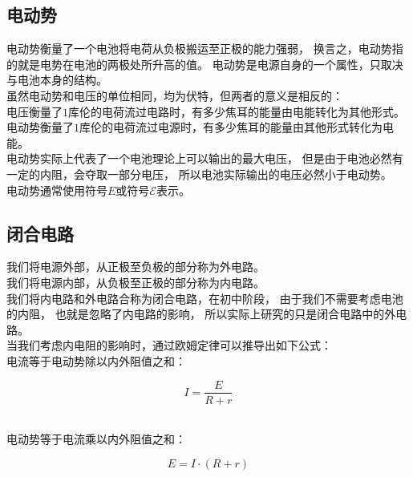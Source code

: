 \documentclass[UTF8]{ctexart}
\begin{document}
\newpage

\subsection{电动势}
    电动势衡量了一个电池将电荷从负极搬运至正极的能力强弱，
    换言之，电动势指的就是电势在电池的两极处所升高的值。
    电动势是电源自身的一个属性，只取决与电池本身的结构。\\[3mm]
    虽然电动势和电压的单位相同，均为伏特，但两者的意义是相反的：\\[3mm]
    电压衡量了$1$库伦的电荷流过电路时，有多少焦耳的能量由电能转化为其他形式。\\[1mm]
    电动势衡量了$1$库伦的电荷流过电源时，有多少焦耳的能量由其他形式转化为电能。\\[3mm]
    电动势实际上代表了一个电池理论上可以输出的最大电压，
    但是由于电池必然有一定的内阻，会夺取一部分电压，
    所以电池实际输出的电压必然小于电动势。\\[3mm]
    电动势通常使用符号$E$或符号$\mathscr{E}$表示。

\subsection{闭合电路}
    我们将电源外部，从正极至负极的部分称为外电路。\\[1mm]
    我们将电源内部，从负极至正极的部分称为内电路。\\[3mm]
    我们将内电路和外电路合称为闭合电路，在初中阶段，
    由于我们不需要考虑电池的内阻，
    也就是忽略了内电路的影响，
    所以实际上研究的只是闭合电路中的外电路。\\[3mm]
    当我们考虑内电阻的影响时，通过欧姆定律可以推导出如下公式：\\[3mm]
    电流等于电动势除以内外阻值之和：
    \begin{large}
        \begin{equation*}
            I = \frac{E}{R+r}       
        \end{equation*}
    \end{large}\\
    电动势等于电流乘以内外阻值之和：
    \begin{large}
        \begin{equation*}
            E = I \cdot \left(R+r\right)
        \end{equation*}
    \end{large}

\newpage
\end{document}
